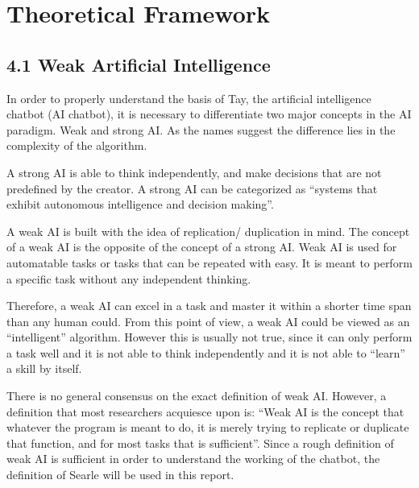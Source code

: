 \chapter{Theoretical Framework}

\section*{\textbf{4.1 Weak Artificial Intelligence}}
In order to properly understand the basis of Tay, the artificial intelligence chatbot (AI chatbot), it is necessary to differentiate two major concepts in the AI paradigm. Weak and strong AI. As the names suggest the difference lies in the complexity of the algorithm. 

A strong AI is able to think independently, and make decisions that are not predefined by the creator. A strong AI can be categorized as “systems that exhibit autonomous intelligence and decision making”\cite{AIdefinitions}.

A weak AI is built with the idea of replication/ duplication in mind. The concept of a weak AI is the opposite of the concept of a strong AI. Weak AI is used for automatable tasks or tasks that can be repeated with easy. It is meant to perform a specific task without any independent thinking. 

Therefore, a weak AI can excel in a task and master it within a shorter time span than any human could. From this point of view, a weak AI could be viewed as an “intelligent” algorithm. However this is usually not true, since it can only perform a task well and it is not able to think independently and it is not able to “learn” a skill by itself. 

There is no general consensus on the exact definition of weak AI. However, a definition that most researchers acquiesce upon is: “Weak AI is the concept that whatever the program is meant to do, it is merely trying to replicate or duplicate that function, and for most tasks that is sufficient”\cite{searleAIdefinition}. Since a rough definition of weak AI is sufficient in order to understand the working of the chatbot, the definition of Searle will be used in this report.

\newpage

